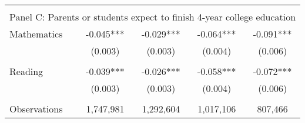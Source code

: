 {\begin{tabular}{lcccc}
&  &  & &  \\
\multicolumn{5}{l}{Panel C: Parents or students expect to finish 4-year college education} \\
Mathematics         &      -0.045***&      -0.029***&      -0.064***&      -0.091***\\
                    &     (0.003)   &     (0.003)   &     (0.004)   &     (0.006)   \\
 
&  &  & &  \\
Reading             &      -0.039***&      -0.026***&      -0.058***&      -0.072***\\
                    &     (0.003)   &     (0.003)   &     (0.004)   &     (0.006)   \\
                    &               &               &               &               \\
Observations        &   1,747,981   &   1,292,604   &   1,017,106   &     807,466   \\
 

\bottomrule
\end{tabular}
}
